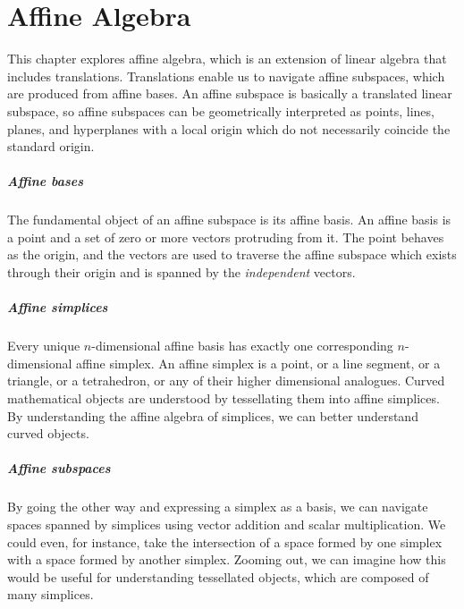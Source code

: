 \chapter{Affine Algebra}

This chapter explores affine algebra, which is an extension of linear 
algebra that includes translations. Translations enable us to navigate 
affine subspaces, which are produced from affine bases. An affine 
subspace is basically a translated linear subspace, so affine 
subspaces can be geometrically interpreted as points, lines, 
planes, and hyperplanes with a local origin which do not necessarily 
coincide the standard origin.

\paragraph{Affine bases}

The fundamental object of an affine subspace is its affine basis.
An affine basis is a point and a set of zero or more vectors 
protruding from it. The point behaves as the origin, and the vectors 
are used to traverse the affine subspace which exists through their 
origin and is spanned by the \textit{independent} vectors.

\paragraph{Affine simplices}

Every unique \(n\)-dimensional affine basis has exactly one
corresponding \(n\)-dimensional affine simplex. An affine simplex
is a point, or a line segment, or a triangle, or a tetrahedron, 
or any of their higher dimensional analogues. Curved mathematical
objects are understood by tessellating them into affine simplices.
By understanding the affine algebra of simplices, we can better 
understand curved objects.

\paragraph{Affine subspaces}

By going the other way and expressing a simplex as a basis, we can 
navigate spaces spanned by simplices using vector addition and 
scalar multiplication. We could even, for instance, take the intersection 
of a space formed by one simplex with a space formed by another simplex.
Zooming out, we can imagine how this would be useful for understanding 
tessellated objects, which are composed of many simplices. 

